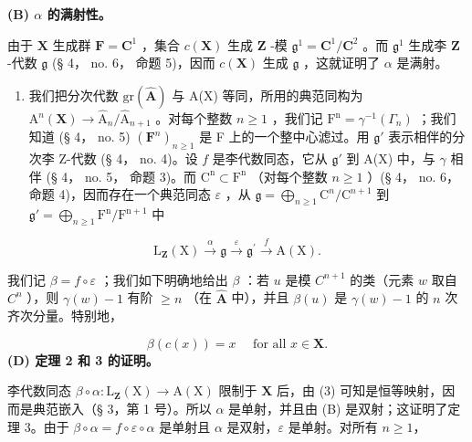 \textbf{(B) \(\alpha\) 的满射性。}

由于 \(\mathbf{X}\) 生成群 \(\mathbf{F} = \mathbf{C}^1\) ，集合 \(c(\mathbf{X})\) 生成 \(\mathbf{Z}\) -模 \(\mathfrak{g}^1 = \mathbf{C}^1 / \mathbf{C}^2\) 。而 \(\mathfrak{g}^1\) 生成李 \(\mathbf{Z}\) -代数 \(\mathfrak{g}\) (§ 4， no. 6， 命题 5)，因而 \(c(\mathbf{X})\) 生成 \(\mathfrak{g}\) ，这就证明了 \(\alpha\) 是满射。

\begin{enumerate}
\def\labelenumi{(\Alph{enumi})}
\setcounter{enumi}{2}
\tightlist
\item
  我们把分次代数 \(\mathrm{gr}(\hat{\mathbf{A}})\) 与 A(X) 等同，所用的典范同构为 \(\mathrm{A}^n (\mathbf{X})\to \hat{\mathrm{A}}_n / \hat{\mathrm{A}}_{n + 1}\) 。对每个整数 \(n\geqslant 1\) ，我们记 \(\mathrm{F^n} = \gamma^{-1}(\Gamma_n)\) ；我们知道 (§ 4， no. 5) \((\mathbf{F}^n)_{n\geqslant 1}\) 是 F 上的一个整中心滤过。用 \(\mathfrak{g}'\) 表示相伴的分次李 Z-代数 (§ 4， no. 4)。设 \(f\) 是李代数同态，它从 \(\mathfrak{g}'\) 到 A(X) 中，与 \(\gamma\) 相伴 (§ 4， no. 5， 命题 3)。而 \(\mathrm{C^n}\subset \mathrm{F^n}\) （对每个整数 \(n\geqslant 1\) ）(§ 4， no. 6， 命题 4)，因而存在一个典范同态 \(\varepsilon\) ，从 \(\mathfrak{g} = \bigoplus_{n\geqslant 1}\mathrm{C}^n /\mathrm{C}^{n + 1}\) 到 \(\mathfrak{g}' = \bigoplus_{n\geqslant 1}\mathrm{F^n / F^{n + 1}}\) 中
\end{enumerate}

\[
\mathrm{L} _ {\mathbf {Z}} (\mathrm{X}) \stackrel {{\alpha}} {{\longrightarrow}} \mathfrak {g} \stackrel {{\varepsilon}} {{\longrightarrow}} \mathfrak {g} ^ {\prime} \stackrel {{f}} {{\longrightarrow}} \mathrm{A} (\mathrm{X}).
\]

我们记 \(\beta = f\circ \varepsilon\) ；我们如下明确地给出 \(\beta\) ：若 \(u\) 是模 \(C^{n + 1}\) 的类（元素 \(w\) 取自 \(C^n\) ），则 \(\gamma (w) - 1\) 有阶 \(\geqslant n\) （在 \(\hat{\mathbf{A}}\) 中），并且 \(\beta (u)\) 是 \(\gamma (w) - 1\) 的 \(n\) 次齐次分量。特别地，

\[
\beta (c (x)) = x \quad \text { for   all } x \in \mathbf {X}.\tag{3}
\]
\relax{}
\textbf{(D) 定理 2 和 3 的证明。}

李代数同态 \(\beta \circ \alpha: \mathrm{L}_{\mathbf{Z}}(\mathrm{X}) \to \mathrm{A}(\mathrm{X})\) 限制于 \(\mathbf{X}\) 后，由 (3) 可知是恒等映射，因而是典范嵌入（§ 3，第 1 号）。所以 \(\alpha\) 是单射，并且由 (B) 是双射；这证明了定理 3。由于 \(\beta \circ \alpha = f \circ \varepsilon \circ \alpha\) 是单射且 \(\alpha\) 是双射，\(\varepsilon\) 是单射。对所有 \(n \geqslant 1\)，


